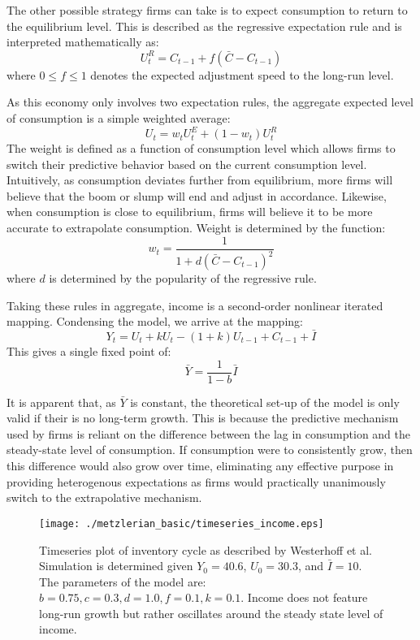 The other possible strategy firms can take is to expect consumption to return to the equilibrium level. This is described as the regressive expectation rule and is interpreted mathematically as:
\begin{equation}
    U_t^R=C_{t-1}+f(\bar C-C_{t-1})
\end{equation}
where $0\leq f\leq 1$ denotes the expected adjustment speed to the long-run level. 

As this economy only involves two expectation rules, the aggregate expected level of consumption is a simple weighted average:
\begin{equation}
    U_t=w_tU_t^E+(1-w_t)U_t^R
\end{equation}
The weight is defined as a function of consumption level which allows firms to switch their predictive behavior based on the current consumption level. Intuitively, as consumption deviates further from equilibrium, more firms will believe that the boom or slump will end and adjust in accordance. Likewise, when consumption is close to equilibrium, firms will believe it to be more accurate to extrapolate consumption. Weight is determined by the function:
\begin{equation}
    w_t=\frac{1}{1+d(\bar C-C_{t-1})^2}
\end{equation}
where $d$ is determined by the popularity of the regressive rule. 

Taking these rules in aggregate, income is a second-order nonlinear iterated mapping. Condensing the model, we arrive at the mapping:
\begin{equation}
    Y_t=U_t+kU_t-(1+k)U_{t-1}+C_{t-1}+\bar I
\end{equation}
This gives a single fixed point of:
\begin{equation}
    \bar Y=\frac{1}{1-b}\bar I
\end{equation}

It is apparent that, as $\bar Y$ is constant, the theoretical set-up of the model is only valid if their is no long-term growth. This is because the predictive mechanism used by firms is reliant on the difference between the lag in consumption and the steady-state level of consumption. If consumption were to consistently grow, then this difference would also grow over time, eliminating any effective purpose in providing heterogenous expectations as firms would practically unanimously switch to the extrapolative mechanism. 


\begin{figure}
    \centering
    \texttt{[image: ./metzlerian\_basic/timeseries\_income.eps]}
    \caption{Timeseries plot of inventory cycle as described by Westerhoff et al.\autocite{Wegener2009} Simulation is determined given $Y_0=40.6$, $U_0=30.3$, and $\bar I=10$. The parameters of the model are: $b=0.75,c=0.3,d=1.0,f=0.1,k=0.1$. Income does not feature long-run growth but rather oscillates around the steady state level of income.}
    \label{metzler_basic_timeseries}
\end{figure}

